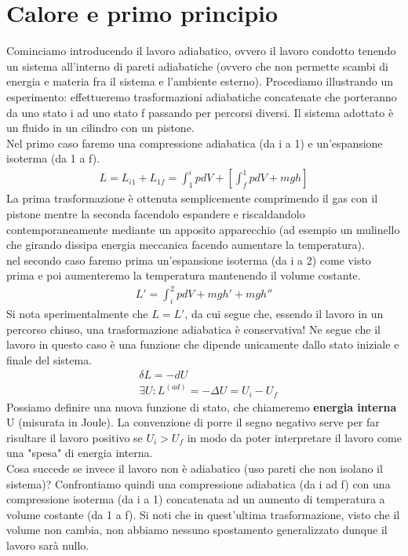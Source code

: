 \documentclass[10pt,a4paper]{article}
\begin{document}
\section{Calore e primo principio}
Cominciamo introducendo il lavoro adiabatico, ovvero il lavoro condotto tenendo un sistema all'interno di pareti adiabatiche (ovvero che non permette scambi di energia e materia fra il sistema e l'ambiente esterno). Procediamo illustrando un esperimento: effettueremo trasformazioni adiabatiche concatenate che porteranno da uno stato i ad uno stato f passando per percorsi diversi. Il sistema adottato è un fluido in un cilindro con un pistone.\\
Nel primo caso faremo una compressione adiabatica (da i a 1) e un'espansione isoterma (da 1 a f). 
\begin{align*} 
	L = L_{i1}+L_{1f}= \int_{1}^{i}pdV +[\int_{f}^{1}pdV+mgh]
\end{align*} 
La prima trasformazione è ottenuta semplicemente comprimendo il gas con il pistone mentre la seconda facendolo espandere e riscaldandolo contemporaneamente mediante un apposito apparecchio (ad esempio un mulinello che girando dissipa energia meccanica facendo aumentare la temperatura).\\
nel secondo caso faremo prima un'espansione isoterma (da i a 2) come visto prima e poi aumenteremo la temperatura mantenendo il volume costante. 
\begin{align*} 
	L' = \int_{i}^{2}pdV+mgh'+mgh''
\end{align*} 
Si nota sperimentalmente che $L = L'$, da cui segue che, essendo il lavoro in un percorso chiuso, una trasformazione adiabatica è conservativa! Ne segue che il lavoro in questo caso è una funzione che dipende unicamente dallo stato iniziale e finale del sistema. 
\begin{align*} 
	&\delta L = -dU\\
	&\exists U : L^{(ad)} = -\Delta U = U_i-U_f
\end{align*} 
Possiamo definire una nuova funzione di stato, che chiameremo \textbf{energia interna} U (misurata in Joule). La convenzione di porre il segno negativo serve per far risultare il lavoro positivo se $U_i>U_f$ in modo da poter interpretare il lavoro come una "spesa" di energia interna.\\
Cosa succede se invece il lavoro non è adiabatico (uso pareti che non isolano il sistema)? Confrontiamo quindi una compressione adiabatica (da i ad f) con una compressione isoterma (da i a 1) concatenata ad un aumento di temperatura a volume costante (da 1 a f). Si noti che in quest'ultima trasformazione, visto che il volume non cambia, non abbiamo nessuno spostamento generalizzato dunque il lavoro sarà nullo. 
\end{document}
